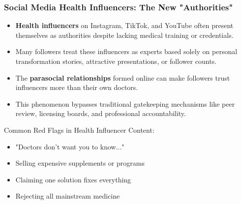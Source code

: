 \documentclass{beamer}
\begin{document}
	\begin{frame}
		\frametitle{Social Media Health Influencers: The New "Authorities"}
		\begin{itemize}
			\item \textbf{Health influencers} on Instagram, TikTok, and YouTube often present themselves as authorities despite lacking medical training or credentials.
			\item Many followers treat these influencers as experts based solely on personal transformation stories, attractive presentations, or follower counts.
			\item The \textbf{parasocial relationships} formed online can make followers trust influencers more than their own doctors.
			\item This phenomenon bypasses traditional gatekeeping mechanisms like peer review, licensing boards, and professional accountability.
		\end{itemize}
		
		\begin{example}
			\scriptsize
			Common Red Flags in Health Influencer Content:
			\begin{itemize}
				\item "Doctors don't want you to know..."
				\item Selling expensive supplements or programs
				\item Claiming one solution fixes everything
				\item Rejecting all mainstream medicine
			\end{itemize}
		\end{example}
	\end{frame}
	
\end{document}
